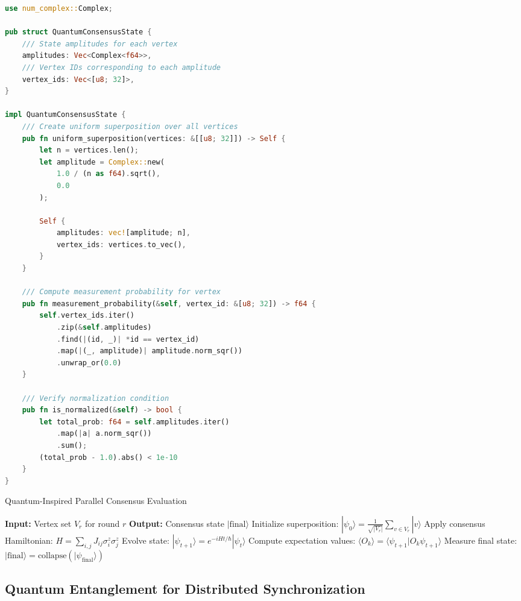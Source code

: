 \documentclass[11pt,a4paper]{article}
\newcommand{\qket}[1]{|#1\rangle}
\newcommand{\qbraket}[2]{\langle#1|#2\rangle}
\newcommand{\qexpect}[1]{\langle#1\rangle}
\begin{document}
\begin{lstlisting}[language=Rust, caption=Quantum Superposition State Representation]
use num_complex::Complex;

pub struct QuantumConsensusState {
    /// State amplitudes for each vertex
    amplitudes: Vec<Complex<f64>>,
    /// Vertex IDs corresponding to each amplitude
    vertex_ids: Vec<[u8; 32]>,
}

impl QuantumConsensusState {
    /// Create uniform superposition over all vertices
    pub fn uniform_superposition(vertices: &[[u8; 32]]) -> Self {
        let n = vertices.len();
        let amplitude = Complex::new(
            1.0 / (n as f64).sqrt(),
            0.0
        );

        Self {
            amplitudes: vec![amplitude; n],
            vertex_ids: vertices.to_vec(),
        }
    }

    /// Compute measurement probability for vertex
    pub fn measurement_probability(&self, vertex_id: &[u8; 32]) -> f64 {
        self.vertex_ids.iter()
            .zip(&self.amplitudes)
            .find(|(id, _)| *id == vertex_id)
            .map(|(_, amplitude)| amplitude.norm_sqr())
            .unwrap_or(0.0)
    }

    /// Verify normalization condition
    pub fn is_normalized(&self) -> bool {
        let total_prob: f64 = self.amplitudes.iter()
            .map(|a| a.norm_sqr())
            .sum();
        (total_prob - 1.0).abs() < 1e-10
    }
}
\end{lstlisting}

\begin{algorithm}[H]
\caption{Quantum-Inspired Parallel Consensus Evaluation}
\begin{algorithmic}
\STATE \textbf{Input:} Vertex set $V_r$ for round $r$
\STATE \textbf{Output:} Consensus state $\qket{\text{final}}$
\STATE
\STATE Initialize superposition: $\qket{\psi_0} = \frac{1}{\sqrt{|V_r|}} \sum_{v \in V_r} \qket{v}$
    \STATE Apply consensus Hamiltonian: $H = \sum_{i,j} J_{ij} \sigma_i^z \sigma_j^z$
    \STATE Evolve state: $\qket{\psi_{t+1}} = e^{-iHt/\hbar} \qket{\psi_t}$
    \STATE Compute expectation values: $\qexpect{O_k} = \qbraket{\psi_{t+1}}{O_k\psi_{t+1}}$
\ENDFOR
\STATE Measure final state: $\qket{\text{final}} = \text{collapse}(\qket{\psi_{\text{final}}})$
\end{algorithmic}
\end{algorithm}

\subsection{Quantum Entanglement for Distributed Synchronization}
\end{document}
